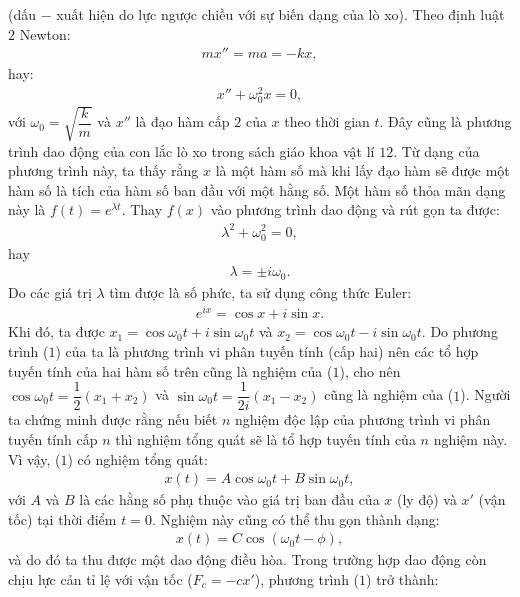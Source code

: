 \begin{multicols}{2}
	(dấu $-$ xuất hiện do lực ngược chiều với sự biến dạng của lò xo).
	\vskip 0.1cm
	Theo định luật $2$ Newton:
	\begin{align*}
		mx''=ma=-kx,
	\end{align*}
	hay:
	\begin{align*}
		x''+\omega_0^2 x=0,		\tag{$1$}
	\end{align*}
	với $\omega_0 = \sqrt{\dfrac{k}{m}}$ và $x''$ là đạo hàm cấp $2$ của $x$ theo thời gian $t$.
	\vskip 0.1cm 
	Đây cũng là phương trình dao động của con lắc lò xo trong sách giáo khoa vật lí $12$.
	\vskip 0.1cm
	Từ dạng của phương trình này, ta thấy rằng $x$ là một hàm số mà khi lấy đạo hàm sẽ được một hàm số là tích của hàm số ban đầu với một hằng số. Một hàm số thỏa mãn dạng này là $f(t) = e^{\lambda t}$. Thay $f(x)$ vào phương trình dao động và rút gọn ta được:
	\begin{align*}
		\lambda^2 + \omega_0^2 = 0,
	\end{align*}
	hay 
	\begin{align*}
		\lambda = \pm i \omega_0.
	\end{align*}
	Do các giá trị $\lambda$ tìm được là số phức, ta sử dụng công thức Euler:
	\begin{align*}
		e^{ix} = \cos x + i \sin x.
	\end{align*}
	Khi đó, ta được $x_1 = \cos\omega_0t + i\sin\omega_0t$ và $x_2 = \cos \omega_0t - i\sin \omega_0t$.
	\vskip 0.1cm
	Do phương trình ($1$) của ta là phương trình vi phân tuyến tính (cấp hai) nên các tổ hợp tuyến tính của hai hàm số trên cũng là nghiệm của ($1$), cho nên $\cos\omega_0t = \dfrac{1}{2}(x_1 + x_2)$ và $\sin \omega_0t = \dfrac{1}{2i}(x_1-x_2)$ cũng là nghiệm của ($1$).
	\vskip 0.1cm
	Người ta chứng minh được rằng nếu biết $n$ nghiệm độc lập của phương trình vi phân tuyến tính cấp $n$ thì nghiệm tổng quát sẽ là tổ hợp tuyến tính của $n$ nghiệm này. Vì vậy, ($1$) có nghiệm tổng quát:
	\begin{align*}
		x(t) = A \cos \omega_0t + B \sin \omega_0t,
	\end{align*}
	với $A$ và $B$ là các hằng số phụ thuộc vào giá trị ban đầu của $x$ (ly độ) và $x'$ (vận tốc) tại thời điểm $t=0$. Nghiệm này cũng có thể thu gọn thành dạng:
	\begin{align*}
		x(t) = C \cos(\omega_0t - \phi),
	\end{align*}
	và do đó ta thu được một dao động điều hòa.
	\vskip 0.1cm
	Trong trường hợp dao động còn chịu lực cản tỉ lệ với vận tốc ($F_c=-cx'$), phương trình ($1$) trở thành:
	\begin{align*}

\end{align*}
\end{multicols}
